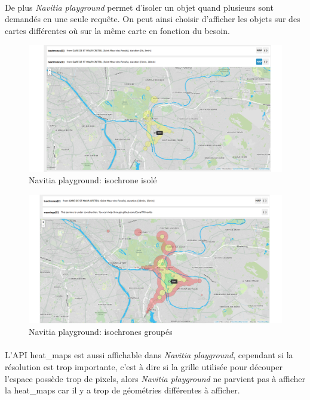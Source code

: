 \documentclass[a4paper]{report}
\begin{document}
\paragraph{} De plus \emph{Navitia playground} permet d'isoler un objet quand plusieurs sont demandés en une seule requête. On peut ainsi choisir d'afficher les objets sur des cartes différentes où sur la même carte en fonction du besoin.

\begin{figure}[H]
	\begin{center}
		\includegraphics[width=400pt]{image/n_p_iso}
		\caption{Navitia playground: isochrone isolé}
		\label{Navitia playground: isochrone isolé}
	\end{center}
\end{figure}

\begin{figure}[H]
	\begin{center}
		\includegraphics[width=400pt]{image/n_p_isochrone}
		\caption{Navitia playground: isochrones groupés}
		\label{Navitia playground: isochrones groupés}
	\end{center}
\end{figure}

\paragraph{}L'API heat\_maps est aussi affichable dans \emph{Navitia playground}, cependant si la résolution est trop importante, c'est à dire si la grille utilisée pour découper l'espace possède trop de pixels, alors \emph{Navitia playground} ne parvient pas à afficher la heat\_maps car il y a trop de géométries différentes à afficher.
\end{document}
